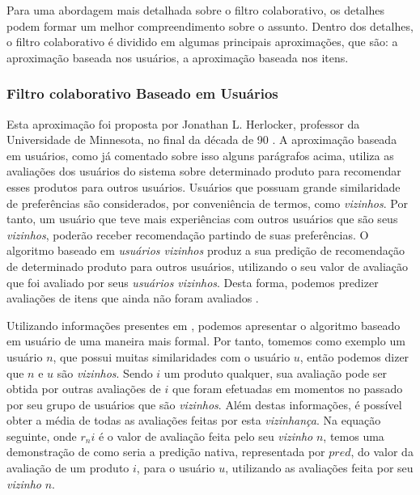 \documentclass[12pt,
				openright,
				twoside,
				a4paper,
				apter=TITLE,
				section=TITLE,
				subsection=TITLE,
				chapter=TITLE,
				english,
				brazil]{abntex2}
\begin{document}
Para uma abordagem mais detalhada sobre o filtro colaborativo, os detalhes podem formar um melhor compreendimento sobre o assunto. Dentro dos detalhes, o filtro colaborativo é dividido em algumas principais aproximações, que são: a aproximação baseada nos usuários, a aproximação baseada nos itens. %


\subsubsection{Filtro colaborativo Baseado em Usuários}
Esta aproximação foi proposta por Jonathan L. Herlocker, professor da Universidade de Minnesota, no final da década de 90 \cite{sun2010new}. A aproximação baseada em usuários, como já comentado sobre isso alguns parágrafos acima, utiliza as avaliações dos usuários do sistema sobre determinado produto para recomendar esses produtos para outros usuários. Usuários que possuam grande similaridade de preferências são considerados, por conveniência de termos, como \textit{vizinhos}. Por tanto, um usuário que teve mais experiências com outros usuários que são seus \textit{vizinhos}, poderão receber recomendação partindo de suas preferências. O algoritmo baseado em \textit{usuários vizinhos} produz a sua predição de recomendação de determinado produto para outros usuários, utilizando o seu valor de avaliação que foi avaliado por seus \textit{usuários vizinhos}. Desta forma, podemos predizer avaliações de itens que ainda não foram avaliados \cite{zhao2010user}\cite{wang2006unifying}. 

Utilizando informações presentes em \cite{schafer2007collaborative}, podemos apresentar o algoritmo baseado em usuário de uma maneira mais formal. Por tanto, tomemos como exemplo um usuário $n$, que possui muitas similaridades com o usuário $u$, então podemos dizer que $n$ e $u$ são \textit{vizinhos}. Sendo $i$ um produto qualquer, sua avaliação pode ser obtida por outras avaliações de $i$ que foram efetuadas em momentos no passado por seu grupo de usuários que são \textit{vizinhos}. Além destas informações, é possível obter a média de todas as avaliações feitas por esta \textit{vizinhança}. Na equação seguinte, onde $r_ni$ é o valor de avaliação feita pelo seu \textit{vizinho} $n$, temos uma demonstração de como seria a predição nativa, representada por $pred$, do valor da avaliação de um produto $i$, para o usuário $u$, utilizando as avaliações feita por seu \textit{vizinho} $n$.
\end{document}
